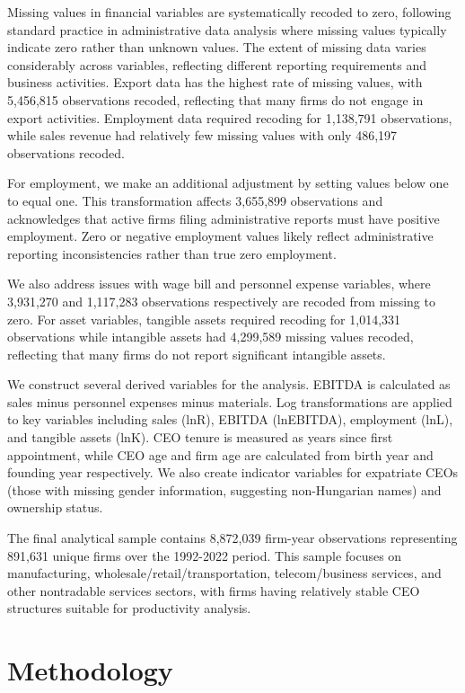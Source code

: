 \documentclass[11pt,a4paper]{article}
\begin{document}
Missing values in financial variables are systematically recoded to zero, following standard practice in administrative data analysis where missing values typically indicate zero rather than unknown values. The extent of missing data varies considerably across variables, reflecting different reporting requirements and business activities. Export data has the highest rate of missing values, with 5,456,815 observations recoded, reflecting that many firms do not engage in export activities. Employment data required recoding for 1,138,791 observations, while sales revenue had relatively few missing values with only 486,197 observations recoded.

For employment, we make an additional adjustment by setting values below one to equal one. This transformation affects 3,655,899 observations and acknowledges that active firms filing administrative reports must have positive employment. Zero or negative employment values likely reflect administrative reporting inconsistencies rather than true zero employment.

We also address issues with wage bill and personnel expense variables, where 3,931,270 and 1,117,283 observations respectively are recoded from missing to zero. For asset variables, tangible assets required recoding for 1,014,331 observations while intangible assets had 4,299,589 missing values recoded, reflecting that many firms do not report significant intangible assets.

We construct several derived variables for the analysis. EBITDA is calculated as sales minus personnel expenses minus materials. Log transformations are applied to key variables including sales (lnR), EBITDA (lnEBITDA), employment (lnL), and tangible assets (lnK). CEO tenure is measured as years since first appointment, while CEO age and firm age are calculated from birth year and founding year respectively. We also create indicator variables for expatriate CEOs (those with missing gender information, suggesting non-Hungarian names) and ownership status.

The final analytical sample contains 8,872,039 firm-year observations representing 891,631 unique firms over the 1992-2022 period. This sample focuses on manufacturing, wholesale/retail/transportation, telecom/business services, and other nontradable services sectors, with firms having relatively stable CEO structures suitable for productivity analysis.



\section{Methodology}
\end{document}
